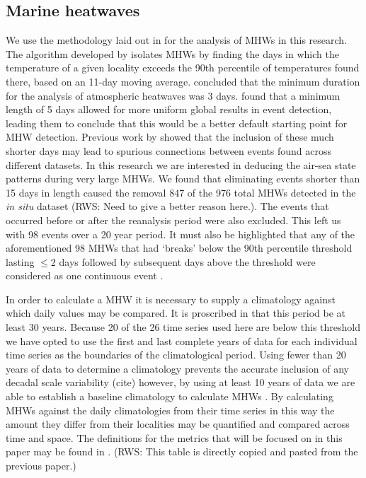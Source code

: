 \documentclass[a4paper,10pt,review]{elsarticle}
\begin{document}
\subsection{Marine heatwaves}
We use the methodology laid out in \citet{Hobday2016} for the analysis of MHWs in this research. The algorithm developed by \citet{Hobday2016} isolates MHWs by finding the days in which the temperature of a given locality exceeds the 90th percentile of temperatures found there, based on an 11-day moving average. \citet{Perkins2013} concluded that the minimum duration for the analysis of atmospheric heatwaves was 3 days. \citet{Hobday2016} found that a minimum length of 5 days allowed for more uniform global results in event detection, leading them to conclude that this would be a better default starting point for MHW detection. Previous work by \citet{Schlegel2016} showed that the inclusion of these much shorter days may lead to spurious connections between events found across different datasets. In this research we are interested in deducing the air-sea state patterns during very large MHWs. We found that eliminating events shorter than 15 days in length caused the removal 847 of the 976 total MHWs detected in the \emph{in situ} dataset (RWS: Need to give a better reason here.). The events that occurred before or after the reanalysis period were also excluded. This left us with 98 events over a 20 year period. It must also be highlighted that any of the aforementioned 98 MHWs that had `breaks' below the 90th percentile threshold lasting $\leq$2 days followed by subsequent days above the threshold were considered as one continuous event \citep{Hobday2016}.

In order to calculate a MHW it is necessary to supply a climatology against which daily values may be compared. It is proscribed in \citet{Hobday2016} that this period be at least 30 years. Because 20 of the 26 time series used here are below this threshold we have opted to use the first and last complete years of data for each individual time series as the boundaries of the climatological period. Using fewer than 20 years of data to determine a climatology prevents the accurate inclusion of any decadal scale variability (cite) however, by using at least 10 years of data we are able to establish a baseline climatology to calculate MHWs \citep{Schlegel2017}. By calculating MHWs against the daily climatologies from their time series in this way the amount they differ from their localities may be quantified and compared across time and space. The definitions for the metrics that will be focused on in this paper may be found in . (RWS: This table is directly copied and pasted from the previous paper.)
\end{document}
